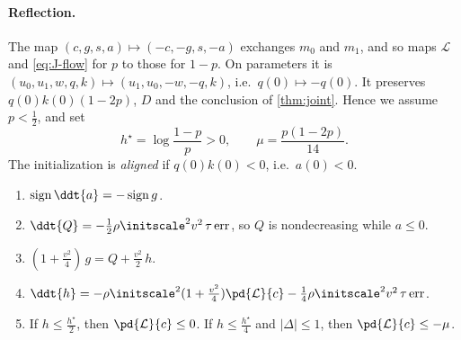 \paragraph{Reflection.} The map $(c,g,s,a)\mapsto(-c,-g,s,-a)$ exchanges $m_0$ and $m_1$, and so maps $\mathcal L$ and \cref{eq:J-flow} for $p$ to those
for $1-p$. On parameters it is $(u_0,u_1,w,q,k)\mapsto(u_1,u_0,-w,-q,k)$, i.e.\ $q(0)\mapsto-q(0)$. It preserves $q(0)k(0)(1-2p)$, $D$ and the
conclusion of \cref{thm:joint}. Hence we assume $p<\frac{1}{2}$, and set
\[
 h^\star=\log\frac{1-p}{p}>0,\qquad \mu=\frac{p(1-2p)}{14}.
\]
The initialization is \emph{aligned} if $q(0)k(0)<0$, i.e.\ $a(0)<0$.

\begin{lemma}
\label{lem:J-drift}
\begin{enumerate}[label=(\alph*),leftmargin=*,itemsep=2pt,topsep=3pt]
\item $\operatorname{sign}\ddt{a}=-\operatorname{sign}g$.
\item $\ddt{Q}=-\frac{1}{2}\rho\initscale^2v^2\,\tau\,\mathrm{err}$, so $Q$ is nondecreasing while $a\le0$.
\item $(1+\frac{v^2}{4})\,g=Q+\frac{v^2}{2}\,h$.
\item $\ddt{h}=-\rho\initscale^2(1+\frac{v^2}{4})\pd{\mathcal L}{c}-\frac{1}{4}\rho\initscale^2v^2\,\tau\,\mathrm{err}$.
\item If $h\le\frac{h^\star}{2}$, then $\pd{\mathcal L}{c}\le0$. If $h\le\frac{h^\star}{4}$ and $|\Delta|\le1$, then $\pd{\mathcal L}{c}\le-\mu$.
\end{enumerate}
\end{lemma}

